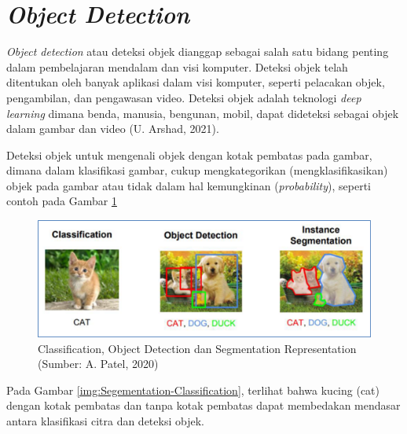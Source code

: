 \section{\textit{Object Detection}}
\hspace{1,2cm}\textit{Object detection} atau deteksi objek dianggap sebagai salah satu bidang penting dalam pembelajaran mendalam dan visi komputer. Deteksi objek telah ditentukan oleh banyak aplikasi dalam visi komputer, seperti pelacakan objek, pengambilan, dan pengawasan video. Deteksi objek adalah teknologi \textit{deep learning} dimana benda, manusia, bengunan, mobil, dapat dideteksi sebagai objek dalam gambar dan video (U. Arshad, 2021).

Deteksi objek untuk mengenali objek dengan kotak pembatas pada gambar, dimana dalam klasifikasi gambar, cukup mengkategorikan (mengklasifikasikan) objek pada gambar atau tidak dalam hal kemungkinan (\textit{probability}), seperti contoh pada Gambar \ref{img:Classification-Object-Detection}

\begin{figure}[H]
	\vspace{-0.1cm}
	\begin{center}
		\includegraphics[width=1\columnwidth]{bab2/Gambar/Picture2.png}
	\end{center}
	\vspace{-0.2cm}
	\caption{Classification, Object Detection dan Segmentation Representation\\(Sumber: A. Patel, 2020)}\label{img:Classification-Object-Detection}
\end{figure}

Pada Gambar \ref{img:Segementation-Classification}, terlihat bahwa kucing (cat) dengan kotak pembatas dan tanpa kotak pembatas dapat membedakan mendasar antara klasifikasi citra dan deteksi objek.

